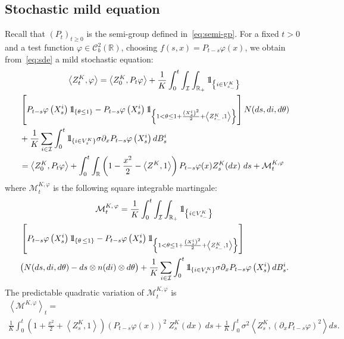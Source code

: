 \documentclass[AHL,Unicode,longabstracts,published]{cedram}
\newcommand{\Co}{\mathcal{C}}
\newcommand{\Io}{\mathcal{I}}
\newcommand{\Mo}{\mathcal{M}}
\newcommand*\R{\mathbb{R}}
\newcommand*\ind{{\mathchoice {\rm 1\mskip-4mu l} {\rm 1\mskip-4mu l} {\rm 1\mskip-4.5mu l} {\rm 1\mskip-5mu l}}}
\begin{document}
\subsection{Stochastic mild equation}\label{app:sde-mild}
\label{app:stoch-mild}
Recall that $(P_t)_{t \geq 0}$ is the semi-group defined in~\eqref{eq:semi-gp}. For a fixed $t >0$ and a test function $\varphi\in \Co_b^2(\R)$, choosing $f(s,x)=P_{t-s}\varphi(x)$, we obtain from~\eqref{eq:sde} a mild stochastic equation:
\begingroup
\allowdisplaybreaks
\begin{multline}\label{eq:sde-mild}
\left\langle Z^{K}_t,\varphi\right\rangle = \left\langle Z^{K}_0,P_t\varphi\right\rangle
+ \frac{1}{K}\int_0^t \int_{\Io}\int_{\R_+}\ind_{\left\{i \in V^K_{s_-}\right\}}\\
\begin{aligned}
& \left[P_{t-s}\varphi\left(X^i_s\right)\ind_{\left\{\theta \leq 1\right\}} - P_{t-s}\varphi\left(X^i_s\right) \ind_{\left\{1 < \theta \leq 1+ \frac{\left(X^i_s\right)^2}{2}+\left\langle Z_{s_-}^{K}, 1\right\rangle\right\}} \right] N(ds, di, d\theta)\\
&+\frac{1}{K}\sum_{i \in \Io}\int_0^t \ind_{\left\{i \in V^K_s\right\}} \sigma \partial_x P_{t-s}\varphi\left(X^i_s\right) dB^i_s\\
 & =\left\langle Z^{K}_0,P_t\varphi\right\rangle+ \int_0^t \int_{\R} \left(1-\frac{x^2}{2}-\left\langle Z^{K},1\right\rangle\right) P_{t-s}\varphi(x) Z^{K}_s(dx)\ ds + \Mo_t^{K, \varphi}
\end{aligned}
\end{multline}
\endgroup
where $\Mo_t^{K, \varphi}$ is the following square integrable martingale:
\begingroup
\allowdisplaybreaks
\begin{multline}\label{app:martingale-mild}
\Mo_t^{K,\,\varphi}= \frac{1}{K}\int_0^t \int_{\Io}\int_{\R_+}\ind_{\left\{i \in  V^K_{s_-}\right\}}\\
\begin{aligned}
&\left[P_{t-s}\varphi\left(X^i_s\right)\ind_{\left\{\theta\,\leq 1\right\}}
- P_{t-s}\varphi\left(X^i_s\right) \ind_{\left\{1 < \theta \leq 1+\frac{\left(X^i_s\right)^2}{2}+\left\langle Z_{s_-}^{K},1\right\rangle\right\}} \right]
\\
&\big(N(ds, di, d\theta)-ds\otimes n(di)\otimes d\theta \big)
+ \frac{1}{K}\sum_{i \in \Io}\int_0^t \ind_{\left\{i \in V^K_s\right\}} \sigma \partial_x P_{t-s}\varphi\left(X^i_s\right) dB^i_s.
\end{aligned}
\end{multline}
\endgroup
The predictable quadratic variation of $\Mo_t^{K,\varphi}$ is
\begin{multline}\label{app:crochet-mild}
\left\langle \Mo^{K, \varphi}\right\rangle_t=\\
\frac{1}{K} \int_0^t \left(1+\frac{x^2}{2}+\left\langle Z_s^{K},1\right\rangle\right) \left(P_{t-s}\varphi(x)\right)^2 \ Z^{K}_s(dx)\ ds+ \frac{1}{K} \int_0^t \sigma^2 \left\langle Z^{K}_s, \left(\partial_x P_{t-s}\varphi \right)^2 \right\rangle ds.
\end{multline}
\end{document}
